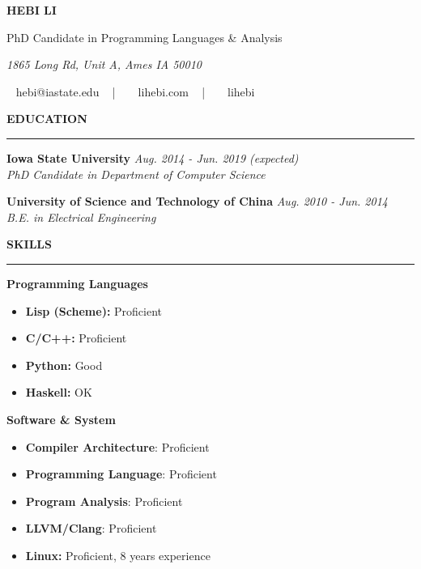 \documentclass[10pt,letterpaper]{article}
\newenvironment{rSection}[1]{ %
  \sectionskip
  \MakeUppercase{\bf #1} %
  \sectionlineskip
  \hrule %
  \begin{list}{}{ %
      \setlength{\leftmargin}{1.5em} %
    }
  \item[]
}{
  \end{list}
}
\def\namesize{\huge} %
\def\sectionlineskip{\medskip} %
\def\nameskip{\bigskip} %
\def\sectionskip{\medskip} %
\begin{document}
{
  \footnotesize
  \begingroup
  \hfil{\MakeUppercase{\namesize\bf Hebi Li}}\hfil
  \nameskip\break
  \endgroup

  \centerline{PhD Candidate in Programming Languages \& Analysis}
  \centerline{\textit{\textcolor{mygray}{1865 Long Rd, Unit A, Ames IA
        50010}}} \centerline{\faEnvelope ~ hebi@iastate.edu ~ | ~
    \faHome ~ lihebi.com ~ | ~ \faGithubSquare ~ lihebi} }

\begin{rSection}{Education}
  \textbf{Iowa State University} \hfill \emph{Aug. 2014 - Jun. 2019
    (expected)} \\ \emph{PhD Candidate in Department of Computer
    Science}

  \textbf{University of Science and Technology of China} \hfill
  \emph{Aug. 2010 - Jun. 2014} \\ \emph{B.E. in Electrical Engineering}

\end{rSection}

\begin{rSection}{Skills}
  \textbf{Programming Languages}
  \begin{itemize}
  \item \textbf{Lisp (Scheme):} Proficient
  \item \textbf{C/C++:} Proficient
  \item \textbf{Python:} Good
  \item \textbf{Haskell:} OK
  \end{itemize}

  \textbf{Software \& System}
  \begin{itemize}
  \item \textbf{Compiler Architecture}: Proficient
  \item \textbf{Programming Language}: Proficient
  \item \textbf{Program Analysis}: Proficient
  \item \textbf{LLVM/Clang}: Proficient
  \item \textbf{Linux:} Proficient, 8 years experience
  \end{itemize}
  
\end{rSection}
\end{document}

